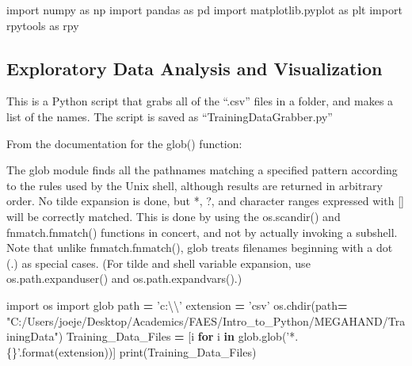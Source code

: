 \documentclass[]{article}
\newenvironment{Shaded}{\begin{snugshade}}{\end{snugshade}}
\newcommand{\KeywordTok}[1]{\textcolor[rgb]{0.13,0.29,0.53}{\textbf{#1}}}
\newcommand{\CharTok}[1]{\textcolor[rgb]{0.31,0.60,0.02}{#1}}
\newcommand{\SpecialCharTok}[1]{\textcolor[rgb]{0.00,0.00,0.00}{#1}}
\newcommand{\StringTok}[1]{\textcolor[rgb]{0.31,0.60,0.02}{#1}}
\newcommand{\ImportTok}[1]{#1}
\newcommand{\ControlFlowTok}[1]{\textcolor[rgb]{0.13,0.29,0.53}{\textbf{#1}}}
\newcommand{\OperatorTok}[1]{\textcolor[rgb]{0.81,0.36,0.00}{\textbf{#1}}}
\newcommand{\BuiltInTok}[1]{#1}
\newcommand{\NormalTok}[1]{#1}
\begin{document}
\begin{Shaded}
\begin{Highlighting}[]
\ImportTok{import}\NormalTok{ numpy }\ImportTok{as}\NormalTok{ np}
\ImportTok{import}\NormalTok{ pandas }\ImportTok{as}\NormalTok{ pd}
\ImportTok{import}\NormalTok{ matplotlib.pyplot }\ImportTok{as}\NormalTok{ plt}
\ImportTok{import}\NormalTok{ rpytools }\ImportTok{as}\NormalTok{ rpy}
\end{Highlighting}
\end{Shaded}

\subsection{Exploratory Data Analysis and
Visualization}\label{exploratory-data-analysis-and-visualization}

This is a Python script that grabs all of the ``.csv'' files in a
folder, and makes a list of the names. The script is saved as
``TrainingDataGrabber.py''

From the documentation for the glob() function:

The glob module finds all the pathnames matching a specified pattern
according to the rules used by the Unix shell, although results are
returned in arbitrary order. No tilde expansion is done, but *, ?, and
character ranges expressed with {[}{]} will be correctly matched. This
is done by using the os.scandir() and fnmatch.fnmatch() functions in
concert, and not by actually invoking a subshell. Note that unlike
fnmatch.fnmatch(), glob treats filenames beginning with a dot (.) as
special cases. (For tilde and shell variable expansion, use
os.path.expanduser() and os.path.expandvars().)

\begin{Shaded}
\begin{Highlighting}[]
\ImportTok{import}\NormalTok{ os}
\ImportTok{import}\NormalTok{ glob}
\NormalTok{path }\OperatorTok{=} \StringTok{'c:}\CharTok{\textbackslash{}\textbackslash{}}\StringTok{'}
\NormalTok{extension }\OperatorTok{=} \StringTok{'csv'}
\NormalTok{os.chdir(path}\OperatorTok{=} \StringTok{"C:/Users/joeje/Desktop/Academics/FAES/Intro_to_Python/MEGAHAND/TrainingData"}\NormalTok{)}
\NormalTok{Training_Data_Files }\OperatorTok{=}\NormalTok{ [i }\ControlFlowTok{for}\NormalTok{ i }\KeywordTok{in}\NormalTok{ glob.glob(}\StringTok{'*.}\SpecialCharTok{\{\}}\StringTok{'}\NormalTok{.}\BuiltInTok{format}\NormalTok{(extension))]}
\BuiltInTok{print}\NormalTok{(Training_Data_Files)}
\end{Highlighting}
\end{Shaded}
\end{document}
